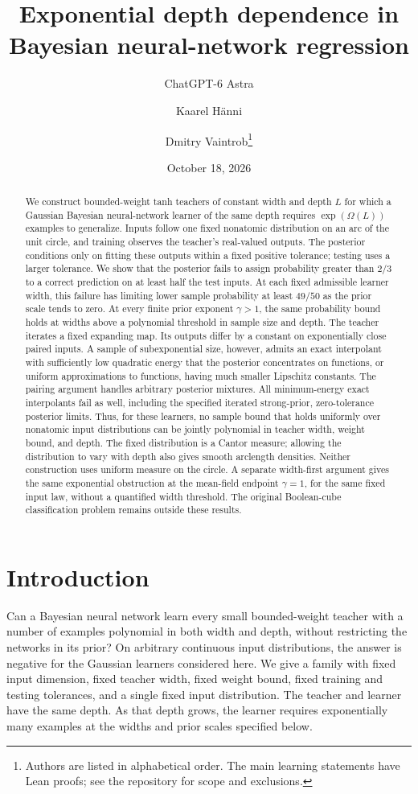 \documentclass[11pt]{article}
\title{Exponential depth dependence in Bayesian neural-network regression}
\author{ChatGPT-6 Astra \and Kaarel H\"anni \and Dmitry Vaintrob\thanks{Authors are listed in alphabetical order. The main learning statements have Lean proofs; see the repository for scope and exclusions.}}
\date{October 18, 2026}
\theoremstyle{remark}\newtheorem{remark}[theorem]{Remark}
\begin{document}
\maketitle
\begin{abstract}
We construct bounded-weight tanh teachers of constant width and depth $L$
for which a Gaussian Bayesian neural-network learner of the same depth
requires
$\exp(\Omega(L))$ examples to generalize. Inputs follow one fixed nonatomic
distribution on an arc of the unit circle, and training observes the
teacher's real-valued outputs. The posterior conditions only on fitting
these outputs within a fixed positive tolerance; testing uses a larger
tolerance. We show that the posterior fails to assign probability greater
than $2/3$ to a correct prediction on at least half the test inputs.
At each fixed admissible learner width, this failure has limiting lower
sample probability at least $49/50$ as the prior scale tends to zero.
At every finite prior exponent $\gamma>1$, the same probability bound
holds at widths above a polynomial threshold in sample size and depth.
The teacher iterates a fixed expanding map. Its outputs differ by a constant
on exponentially close paired inputs. A sample of subexponential size,
however, admits an exact interpolant with sufficiently low quadratic
energy that the posterior concentrates on functions, or uniform
approximations to functions, having much smaller Lipschitz constants.
The pairing argument handles arbitrary posterior mixtures. All
minimum-energy exact interpolants fail as well, including the specified
iterated strong-prior, zero-tolerance posterior limits.
Thus, for these learners, no sample bound that holds uniformly over
nonatomic input distributions can be jointly polynomial in teacher width,
weight bound, and depth. The fixed distribution is a Cantor measure; allowing the
distribution to vary with depth also gives smooth arclength densities.
Neither construction uses uniform measure on the circle.
A separate width-first argument gives the same exponential obstruction
at the mean-field endpoint $\gamma=1$, for the same fixed input law,
without a quantified width threshold.
The original Boolean-cube classification problem remains outside
these results.
\end{abstract}

\section{Introduction}
Can a Bayesian neural network learn every small bounded-weight teacher
with a number of examples polynomial in both width and depth, without
restricting the networks in its prior? On arbitrary continuous input
distributions, the answer is negative for the Gaussian learners considered
here. We give a family with fixed input dimension, fixed teacher width,
fixed weight bound, fixed training and testing tolerances, and a single
fixed input distribution. The teacher and learner have the same depth.
As that depth grows, the learner requires exponentially many examples
at the widths and prior scales specified below.
\end{document}
